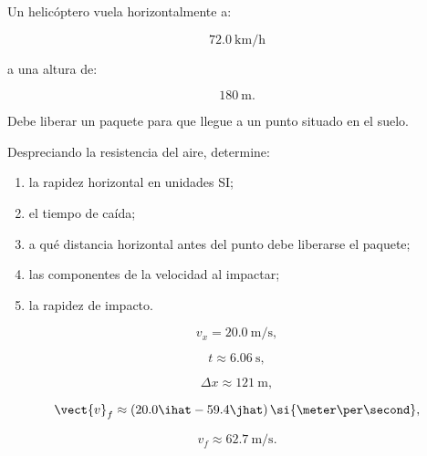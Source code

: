 \begin{ejercicio}
Un helicóptero vuela horizontalmente a:

\[
\SI{72.0}{\kilo\meter\per\hour}
\]

a una altura de:

\[
\SI{180}{\meter}.
\]

Debe liberar un paquete para que llegue a un punto situado en el suelo.

Despreciando la resistencia del aire, determine:

\begin{enumerate}[label=\alph*)]
    \item la rapidez horizontal en unidades SI;
    \item el tiempo de caída;
    \item a qué distancia horizontal antes del punto debe liberarse el paquete;
    \item las componentes de la velocidad al impactar;
    \item la rapidez de impacto.
\end{enumerate}
\end{ejercicio}

\begin{respuesta}
\[
v_x=\SI{20.0}{\meter\per\second},
\]

\[
t\approx\SI{6.06}{\second},
\]

\[
\Delta x\approx\SI{121}{\meter},
\]

\[
\vect{v}_f
\approx
(20.0\ihat-59.4\jhat)
\,\si{\meter\per\second},
\]

\[
\boxed{
v_f\approx\SI{62.7}{\meter\per\second}
}.
\]
\end{respuesta}

